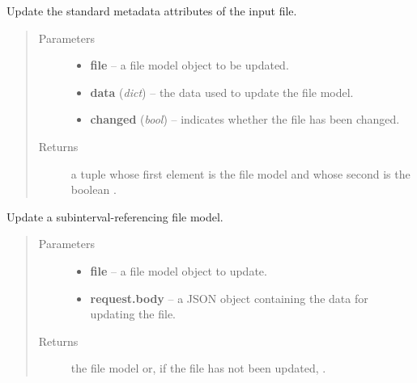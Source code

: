 \documentclass[letterpaper,10pt,english]{sphinxmanual}
\begin{document}

\begin{fulllineitems}
\label{api:onlinelinguisticdatabase.controllers.files.updateStandardMetadata}
Update the standard metadata attributes of the input file.
\begin{quote}\begin{description}
\item[{Parameters}] \leavevmode\begin{itemize}
\item {} 
\textbf{file} -- a file model object to be updated.

\item {} 
\textbf{data} (\emph{dict}) -- the data used to update the file model.

\item {} 
\textbf{changed} (\emph{bool}) -- indicates whether the file has been changed.

\end{itemize}

\item[{Returns}] \leavevmode
a tuple whose first element is the file model and whose second is
the boolean .

\end{description}\end{quote}

\end{fulllineitems}


\begin{fulllineitems}
\label{api:onlinelinguisticdatabase.controllers.files.updateSubintervalReferencingFile}
Update a subinterval-referencing file model.
\begin{quote}\begin{description}
\item[{Parameters}] \leavevmode\begin{itemize}
\item {} 
\textbf{file} -- a file model object to update.

\item {} 
\textbf{request.body} -- a JSON object containing the data for updating the file.

\end{itemize}

\item[{Returns}] \leavevmode
the file model or, if the file has not been updated, .

\end{description}\end{quote}

\end{fulllineitems}
\end{document}
